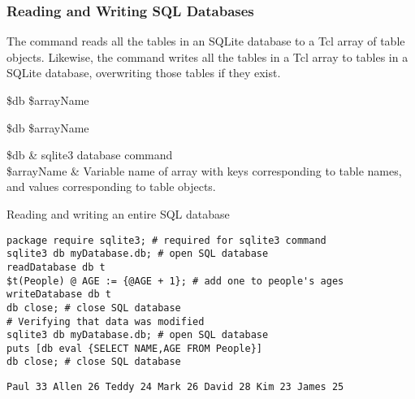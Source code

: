 \subsubsection{Reading and Writing SQL Databases}
The command  reads all the tables in an SQLite database to a Tcl array of table objects.
Likewise, the command  writes all the tables in a Tcl array to tables in a SQLite database, overwriting those tables if they exist. 
\begin{syntax}
 \$db \$arrayName
\end{syntax}
\begin{syntax}
 \$db \$arrayName
\end{syntax}
\begin{args}
\$db & sqlite3 database command \\
\$arrayName & Variable name of array with keys corresponding to table names, and values corresponding to table objects.
\end{args}

\begin{example}{Reading and writing an entire SQL database}
\begin{lstlisting}
package require sqlite3; # required for sqlite3 command
sqlite3 db myDatabase.db; # open SQL database
readDatabase db t
$t(People) @ AGE := {@AGE + 1}; # add one to people's ages
writeDatabase db t
db close; # close SQL database
# Verifying that data was modified
sqlite3 db myDatabase.db; # open SQL database
puts [db eval {SELECT NAME,AGE FROM People}]
db close; # close SQL database
\end{lstlisting}
\tcblower
\begin{lstlisting}
Paul 33 Allen 26 Teddy 24 Mark 26 David 28 Kim 23 James 25
\end{lstlisting}
\end{example}
\clearpage

